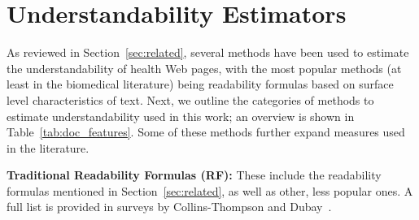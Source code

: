 
\section{ Understandability Estimators}
\label{sec:proxies}

As reviewed in Section~\ref{sec:related}, several methods have been used to estimate the understandability of health Web pages, with the most popular methods (at least in the biomedical literature) being readability formulas based on surface level characteristics of text. Next, we outline the categories of methods to estimate understandability used in this work; an overview is shown in Table~\ref{tab:doc_features}. Some of these methods further expand measures used in the literature. 
 


\textbf{Traditional Readability Formulas (RF):}
These include the readability formulas mentioned in Section~\ref{sec:related}, as well as other, less popular ones. A full list is provided in surveys by Collins-Thompson \cite{collins2014computational} and Dubay~\cite{dubay04}.




